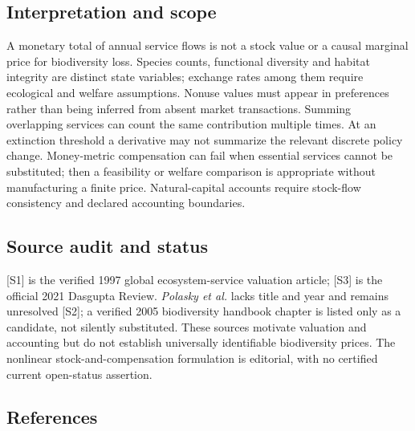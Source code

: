 \documentclass[11pt,a4paper]{article}
\begin{document}
\subsection*{Interpretation and scope}

A monetary total of annual service flows is not a stock value or a causal marginal price for biodiversity loss. Species counts, functional diversity and habitat integrity are distinct state variables; exchange rates among them require ecological and welfare assumptions. Nonuse values must appear in preferences rather than being inferred from absent market transactions. Summing overlapping services can count the same contribution multiple times. At an extinction threshold a derivative may not summarize the relevant discrete policy change. Money-metric compensation can fail when essential services cannot be substituted; then a feasibility or welfare comparison is appropriate without manufacturing a finite price. Natural-capital accounts require stock-flow consistency and declared accounting boundaries.

\subsection*{Source audit and status}

[S1] is the verified 1997 global ecosystem-service valuation article; [S3] is the official 2021 Dasgupta Review. \emph{Polasky et al.} lacks title and year and remains unresolved [S2]; a verified 2005 biodiversity handbook chapter is listed only as a candidate, not silently substituted. These sources motivate valuation and accounting but do not establish universally identifiable biodiversity prices. The nonlinear stock-and-compensation formulation is editorial, with no certified current open-status assertion.

\subsection*{References}
\end{document}
